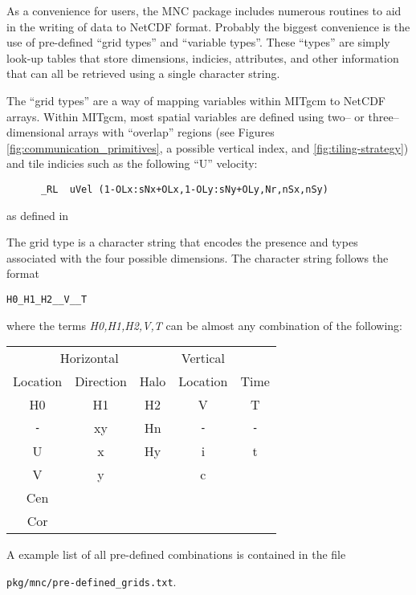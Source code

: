 As a convenience for users, the MNC package includes numerous routines
to aid in the writing of data to NetCDF format.  Probably the biggest
convenience is the use of pre-defined ``grid types'' and ``variable
types''.  These ``types'' are simply look-up tables that store
dimensions, indicies, attributes, and other information that can all
be retrieved using a single character string.

The ``grid types'' are a way of mapping variables within MITgcm to
NetCDF arrays.  Within MITgcm, most spatial variables are defined
using two-- or three--dimensional arrays with ``overlap'' regions (see
Figures \ref{fig:communication_primitives}, a possible vertical index,
and \ref{fig:tiling-strategy}) and tile indicies such as the following
``U'' velocity:
\begin{verbatim}
      _RL  uVel (1-OLx:sNx+OLx,1-OLy:sNy+OLy,Nr,nSx,nSy)
\end{verbatim}
as defined in 

The grid type is a character string that encodes the presence and
types associated with the four possible dimensions.  The character
string follows the format
\begin{center}
  \texttt{H0\_H1\_H2\_\_V\_\_T}
\end{center}
where the terms \textit{H0,H1,H2,V,T} can be almost any combination of
the following:
\begin{center}
  \begin{tabular}[h]{|ccc|c|c|}\hline
    \multicolumn{3}{|c|}{Horizontal} & Vertical &  \\
    Location & Direction & Halo & Location & Time  \\\hline
    H0  &  H1  &  H2  &  V  &  T  \\\hline
    \texttt{-} & xy & Hn & \texttt{-} & \texttt{-} \\
    U  &  x  &  Hy  &  i  &  t  \\
    V  &  y  &      &  c  &     \\
    Cen  &   &      &     &     \\
    Cor  &   &      &     &     \\\hline
  \end{tabular}
\end{center}
A example list of all pre-defined combinations is contained in the
file
\begin{center}
  \texttt{pkg/mnc/pre-defined\_grids.txt}.
\end{center}



